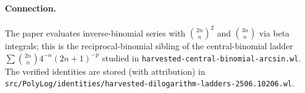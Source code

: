 \documentclass[11pt]{article}
\newcommand{\code}[1]{\texttt{\small #1}}
\begin{document}
\paragraph{Connection.} The paper evaluates inverse-binomial series with $\binom{2n}{n}^{\!2}$ and
$\binom{3n}{n}$ via beta integrals; this is the reciprocal-binomial sibling of the central-binomial
ladder $\sum\binom{2n}{n}4^{-n}(2n{+}1)^{-p}$ studied in \code{harvested-central-binomial-arcsin.wl}.
The verified identities are stored (with attribution) in
\code{src/PolyLog/identities/harvested-dilogarithm-ladders-2506.10206.wl}.
\end{document}
